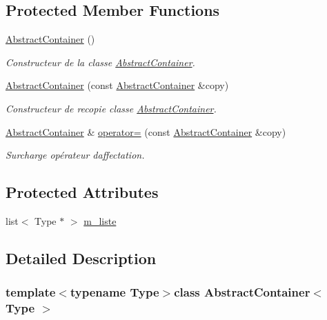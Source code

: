 \subsection*{Protected Member Functions}
\begin{DoxyCompactItemize}
\item 
\hyperlink{class_abstract_container_a70e1448c23f2553552b11e3f5d447be8}{Abstract\+Container} ()
\begin{DoxyCompactList}\small\item\em Constructeur de la classe \hyperlink{class_abstract_container}{Abstract\+Container}. \end{DoxyCompactList}\item 
\hyperlink{class_abstract_container_aa52de80e7b8c9377c72087cb70ae47a8}{Abstract\+Container} (const \hyperlink{class_abstract_container}{Abstract\+Container} \&copy)
\begin{DoxyCompactList}\small\item\em Constructeur de recopie classe \hyperlink{class_abstract_container}{Abstract\+Container}. \end{DoxyCompactList}\item 
\hyperlink{class_abstract_container}{Abstract\+Container} \& \hyperlink{class_abstract_container_ac8ee9b46b1c2047fd23536f5d1cb9122}{operator=} (const \hyperlink{class_abstract_container}{Abstract\+Container} \&copy)
\begin{DoxyCompactList}\small\item\em Surcharge opérateur d\textquotesingle{}affectation. \end{DoxyCompactList}\end{DoxyCompactItemize}
\subsection*{Protected Attributes}
\begin{DoxyCompactItemize}
\item 
list$<$ Type $\ast$ $>$ \hyperlink{class_abstract_container_ae67aa7705ed73b443f6812ddc74a1056}{m\+\_\+liste}
\end{DoxyCompactItemize}


\subsection{Detailed Description}
\subsubsection*{template$<$typename Type$>$class Abstract\+Container$<$ Type $>$}

